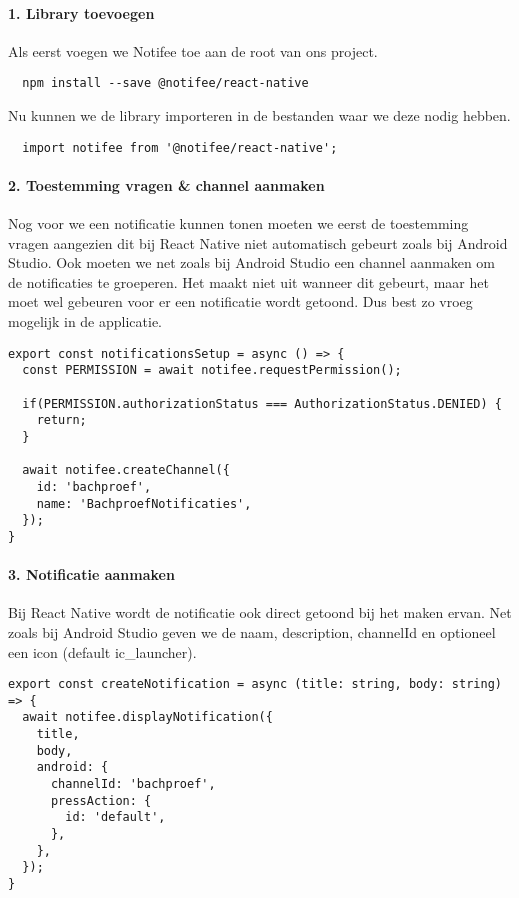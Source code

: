 \paragraph{1. Library toevoegen}
Als eerst voegen we Notifee toe aan de root van ons project.
\begin{verbatim}
  npm install --save @notifee/react-native
\end{verbatim}
Nu kunnen we de library importeren in de bestanden waar we deze nodig hebben.
\begin{verbatim}
  import notifee from '@notifee/react-native';
\end{verbatim}

\paragraph{2. Toestemming vragen \& channel aanmaken}
Nog voor we een notificatie kunnen tonen moeten we eerst de toestemming vragen aangezien dit bij React Native 
niet automatisch gebeurt zoals bij Android Studio. Ook moeten we net zoals bij Android Studio 
een channel aanmaken om de notificaties te groeperen. Het maakt niet uit wanneer dit gebeurt, maar 
het moet wel gebeuren voor er een notificatie wordt getoond. Dus best zo vroeg mogelijk in de applicatie.
\begin{verbatim}
export const notificationsSetup = async () => {
  const PERMISSION = await notifee.requestPermission();

  if(PERMISSION.authorizationStatus === AuthorizationStatus.DENIED) {
    return;
  }

  await notifee.createChannel({
    id: 'bachproef',
    name: 'BachproefNotificaties',
  });
}

\end{verbatim}

\paragraph{3. Notificatie aanmaken}
Bij React Native wordt de notificatie ook direct getoond bij het maken ervan. Net zoals bij Android Studio 
geven we de naam, description, channelId en optioneel een icon (default ic\_launcher). 
\begin{verbatim}
export const createNotification = async (title: string, body: string) => {
  await notifee.displayNotification({
    title,
    body,
    android: {
      channelId: 'bachproef',
      pressAction: {
        id: 'default',
      },
    },
  });
}
\end{verbatim}

